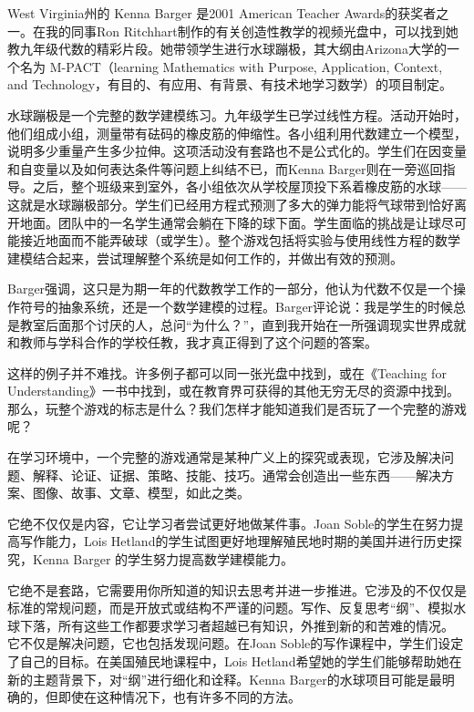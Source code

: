West Virginia州的 Kenna Barger 是2001 American Teacher Awards的获奖者之一。在我的同事Ron Ritchhart制作的有关创造性教学的视频光盘中，可以找到她教九年级代数的精彩片段。她带领学生进行水球蹦极，其大纲由Arizona大学的一个名为 M-PACT（learning Mathematics with Purpose, Application, Context, and Technology，有目的、有应用、有背景、有技术地学习数学）的项目制定。

水球蹦极是一个完整的数学建模练习。九年级学生已学过线性方程。活动开始时，他们组成小组，测量带有砝码的橡皮筋的伸缩性。各小组利用代数建立一个模型，说明多少重量产生多少拉伸。这项活动没有套路也不是公式化的。学生们在因变量和自变量以及如何表达条件等问题上纠结不已，而Kenna Barger则在一旁巡回指导。之后，整个班级来到室外，各小组依次从学校屋顶投下系着橡皮筋的水球——这就是水球蹦极部分。学生们已经用方程式预测了多大的弹力能将气球带到恰好离开地面。团队中的一名学生通常会躺在下降的球下面。学生面临的挑战是让球尽可能接近地面而不能弄破球（或学生）。整个游戏包括将实验与使用线性方程的数学建模结合起来，尝试理解整个系统是如何工作的，并做出有效的预测。

Barger强调，这只是为期一年的代数教学工作的一部分，他认为代数不仅是一个操作符号的抽象系统，还是一个数学建模的过程。Barger评论说：我是学生的时候总是教室后面那个讨厌的人，总问“为什么？”，直到我开始在一所强调现实世界成就和教师与学科合作的学校任教，我才真正得到了这个问题的答案。

这样的例子并不难找。许多例子都可以同一张光盘中找到，或在《Teaching for Understanding》一书中找到，或在教育界可获得的其他无穷无尽的资源中找到。那么，玩整个游戏的标志是什么？我们怎样才能知道我们是否玩了一个完整的游戏呢？

在学习环境中，一个完整的游戏通常是某种广义上的探究或表现，它涉及解决问题、解释、论证、证据、策略、技能、技巧。通常会创造出一些东西——解决方案、图像、故事、文章、模型，如此之类。

它绝不仅仅是内容，它让学习者尝试更好地做某件事。Joan Soble的学生在努力提高写作能力，Lois Hetland的学生试图更好地理解殖民地时期的美国并进行历史探究，Kenna Barger 的学生努力提高数学建模能力。

它绝不是套路，它需要用你所知道的知识去思考并进一步推进。它涉及的不仅仅是标准的常规问题，而是开放式或结构不严谨的问题。写作、反复思考“纲”、模拟水球下落，所有这些工作都要求学习者超越已有知识，外推到新的和苦难的情况。
它不仅是解决问题，它也包括发现问题。在Joan Soble的写作课程中，学生们设定了自己的目标。在美国殖民地课程中，Lois Hetland希望她的学生们能够帮助她在新的主题背景下，对“纲”进行细化和诠释。Kenna Barger的水球项目可能是最明确的，但即使在这种情况下，也有许多不同的方法。

